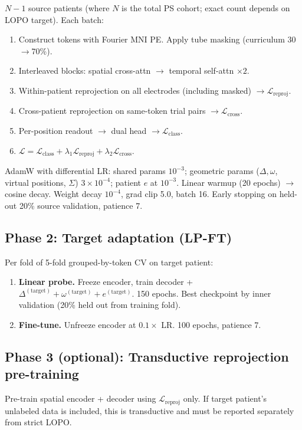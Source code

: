 \documentclass[11pt,letterpaper]{article}
\begin{document}
$N{-}1$ source patients (where $N$ is the total PS cohort; exact count depends on LOPO target). Each batch:
\begin{enumerate}[leftmargin=2em]
\item Construct tokens with Fourier MNI PE. Apply tube masking (curriculum 30$\to$70\%).
\item Interleaved blocks: spatial cross-attn $\to$ temporal self-attn $\times 2$.
\item Within-patient reprojection on all electrodes (including masked) $\to \mathcal{L}_{\text{reproj}}$.
\item Cross-patient reprojection on same-token trial pairs $\to \mathcal{L}_{\text{cross}}$.
\item Per-position readout $\to$ dual head $\to \mathcal{L}_{\text{class}}$.
\item $\mathcal{L} = \mathcal{L}_{\text{class}} + \lambda_1 \mathcal{L}_{\text{reproj}} + \lambda_2 \mathcal{L}_{\text{cross}}$.
\end{enumerate}

AdamW with differential LR: shared params $10^{-3}$; geometric params ($\Delta, \omega$, virtual positions, $\Sigma$) $3 {\times} 10^{-4}$; patient $e$ at $10^{-3}$. Linear warmup (20 epochs) $\to$ cosine decay. Weight decay $10^{-4}$, grad clip 5.0, batch 16. Early stopping on held-out 20\% source validation, patience 7.

\subsection{Phase 2: Target adaptation (LP-FT)}

Per fold of 5-fold grouped-by-token CV on target patient:
\begin{enumerate}[leftmargin=2em]
\item \textbf{Linear probe.} Freeze encoder, train decoder + $\Delta^{(\text{target})} + \omega^{(\text{target})} + e^{(\text{target})}$. 150 epochs. Best checkpoint by inner validation (20\% held out from training fold).
\item \textbf{Fine-tune.} Unfreeze encoder at $0.1\times$ LR. 100 epochs, patience 7.
\end{enumerate}

\subsection{Phase 3 (optional): Transductive reprojection pre-training}

Pre-train spatial encoder + decoder using $\mathcal{L}_{\text{reproj}}$ only. If target patient's unlabeled data is included, this is transductive and must be reported separately from strict LOPO.
\end{document}
